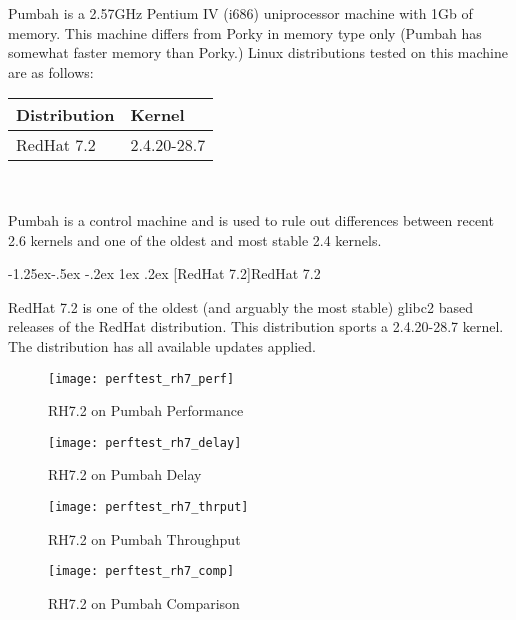 \documentclass[letterpaper,final,notitlepage,twocolumn,10pt,twoside]{article}
\makeatletter
\let\normalsize = \small
\let\small = \footnotesize
\let\footnotesize = \scriptsize
\let\scriptsize = \tiny
\renewcommand\subsubsection{\@startsection{subsubsection}{3}{\z@}%
                                     {-1.25ex\@plus -.5ex \@minus -.2ex}%
                                     {1ex \@plus .2ex}%
                                     {\normalfont\normalsize\bfseries}}
\makeatother
\begin{document}
Pumbah is a 2.57GHz Pentium IV (i686) uniprocessor machine with 1Gb of memory.  This machine differs
from Porky in memory type only (Pumbah has somewhat faster memory than Porky.) Linux distributions
tested on this machine are as follows:

\small
\setlength{\tabcolsep}{0.4em}
\setlength{\arraycolsep}{0.4em}
\begin{tabular}{ll}\\
Distribution & Kernel\\
\hline
RedHat 7.2 & 2.4.20-28.7\\
\end{tabular}\\[1.0ex]
\normalsize

Pumbah is a control machine and is used to rule out differences between recent 2.6 kernels and one
of the oldest and most stable 2.4 kernels.

\subsubsection[RedHat 7.2]{RedHat 7.2}

RedHat 7.2 is one of the oldest (and arguably the most stable) glibc2 based releases of the RedHat
distribution.  This distribution sports a 2.4.20-28.7 kernel.  The distribution has all available
updates applied.

\begin{figure}[p]
\texttt{[image: perftest\_rh7\_perf]}
\caption[RH7.2 on Pumbah Performance]{RH7.2 on Pumbah Performance}
\label{figure:rh7perf}
\end{figure}

\begin{figure}[p]
\texttt{[image: perftest\_rh7\_delay]}
\caption[RH7.2 on Pumbah Delay]{RH7.2 on Pumbah Delay}
\label{figure:rh7delay}
\end{figure}

\begin{figure}[p]
\texttt{[image: perftest\_rh7\_thrput]}
\caption[RH7.2 on Pumbah Throughput]{RH7.2 on Pumbah Throughput}
\label{figure:rh7thrput}
\end{figure}

\begin{figure}[pt]
\texttt{[image: perftest\_rh7\_comp]}
\caption[RH7.2 on Pumbah Comparison]{RH7.2 on Pumbah Comparison}
\label{figure:rh7comp}
\end{figure}
\end{document}
